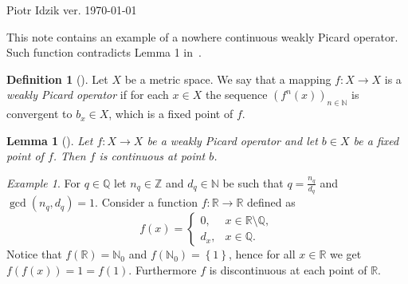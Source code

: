 \documentclass[12pt]{article}
\newcommand{\R}{\mathbb{R}}
\newcommand{\Q}{\mathbb{Q}}
\newcommand{\Z}{\mathbb{Z}}
\newcommand{\N}{\mathbb{N}}
\newcommand{\define}[1]{\textit{#1}}
\newcommand{\paren}[1]{\! \left(#1 \right)}
\newcommand{\set}[1]{\! \left\{#1 \right\}}
\theoremstyle{plain}
\newtheorem{lemma}[theorem]{Lemma}
\theoremstyle{definition}
\newtheorem{definition}[theorem]{Definition}
\theoremstyle{remark}
\newtheorem{example}[theorem]{Example}
\begin{document}
\noindent Piotr Idzik \hfill ver. \today\ \currenttime{}

\vspace*{1cm}
This note contains an example of a nowhere continuous weakly Picard operator.
Such function contradicts Lemma 1 in~\cite{VasileBerinde2011}.

\begin{definition}[{{\cite[Definition 2]{VasileBerinde2011}}}]
    Let $X$ be a metric space.
    We say that a mapping $f \colon X \to X$ is a \define{weakly Picard operator} if
    for each $x \in X$ the sequence $(f^n(x))_{n \in \N}$
    is convergent to $b_x \in X$, which is a fixed point of $f$.
\end{definition}

\begin{lemma}[{{\cite[Lemma 1]{VasileBerinde2011}}}]
    Let $f \colon X \to X$ be a weakly Picard operator and let $b \in X$ be a fixed point of $f$.
    Then $f$ is continuous at point $b$. 
\end{lemma}

\begin{example}
    For $q \in \Q$ let $n_q \in \Z$ and $d_q \in \N$ be such that $q = \frac{n_q}{d_q}$ and $\gcd\paren{n_q, d_q} = 1$.
    Consider a function $f \colon \R \to \R$ defined as
    \begin{equation*}
        f(x) = \left\{ \begin{array}{ll}
            0, & x \in \R \setminus \Q,\\
            d_x, & x \in \Q.
               \end{array} \right.
    \end{equation*} 
    Notice that $f(\R) = \N_0$ and $f(\N_0) = \set{1}$, hence for all $x \in \R$ we get $f\paren{f\paren{x}} = 1 = f\paren{1}$.
    Furthermore $f$ is discontinuous at each point of $\R$.       
\end{example}

{}

\end{document}
